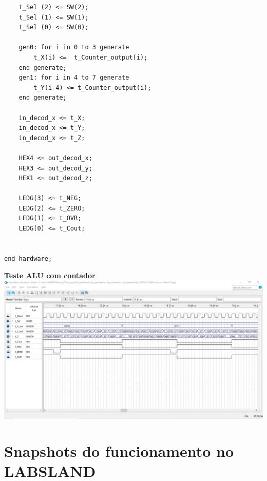 \documentclass{article}
\begin{document}
\begin{verbatim}
	t_Sel (2) <= SW(2);
	t_Sel (1) <= SW(1);
	t_Sel (0) <= SW(0);
	
	gen0: for i in 0 to 3 generate
		t_X(i) <=  t_Counter_output(i);
	end generate;
	gen1: for i in 4 to 7 generate
		t_Y(i-4) <= t_Counter_output(i);
	end generate;
	
	in_decod_x <= t_X;
	in_decod_x <= t_Y;
	in_decod_x <= t_Z;
	
	HEX4 <= out_decod_x;
	HEX3 <= out_decod_y;
	HEX1 <= out_decod_z;
	
	LEDG(3) <= t_NEG;
	LEDG(2) <= t_ZERO;
	LEDG(1) <= t_OVR;
	LEDG(0) <= t_Cout;
	
	
end hardware; 

\end{verbatim}

\begin{center}
\textbf{Teste ALU com contador}
\includegraphics[width=\textwidth]{img/teste_alu_com_contador.png}
\end{center}

\section{Snapshots do funcionamento no LABSLAND}
\end{document}
